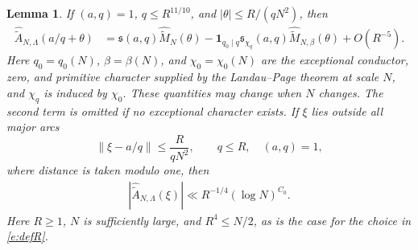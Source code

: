 \documentclass[12pt,reqno]{amsart}
\numberwithin{equation}{section}
\newtheorem{lemma}[equation]{Lemma}
\theoremstyle{definition}
\theoremstyle{remark}
\begin{document}
\begin{lemma}\label{l:prime-square-input}
If \((a,q)=1\), \(q\leq R^{11/10}\), and
\(|\theta|\leq R/(qN^2)\), then
\begin{align}\label{e:usualnearzerosiegel}
 \widehat{\widetilde A}_{N,\Lambda}(a/q+\theta)
 &=\mathfrak s(a,q)\widehat{\widetilde M}_N(\theta)
 -\mathbf1_{q_0\mid q}\mathfrak s_{\chi_q}(a,q)
   \widehat{\widetilde M}_{N,\beta}(\theta)
 +O(R^{-5}).
\end{align}
Here \(q_0=q_0(N)\), \(\beta=\beta(N)\), and
\(\chi_0=\chi_0(N)\) are the exceptional conductor, zero, and primitive
character supplied by the Landau--Page theorem at scale \(N\), and
\(\chi_q\) is induced by \(\chi_0\).  These quantities may change when
\(N\) changes. The second term is omitted if no exceptional character
exists. If $\xi$ lies outside all major arcs
\[
 \left\|\xi-a/q\right\|\leq\frac{R}{qN^2},
 \qquad q\leq R,\quad(a,q)=1,
\]
where distance is taken modulo one, then
\begin{align}\label{e:prime-square-minor-input}
 |\widehat{\widetilde A}_{N,\Lambda}(\xi)|
 \ll R^{-1/4}(\log N)^{C_0}.
\end{align}
Here $R\geq1$, $N$ is sufficiently large, and $R^4\leq N/2$,
as is the case for the choice in \eqref{e:defR}.
\end{lemma}
\end{document}
